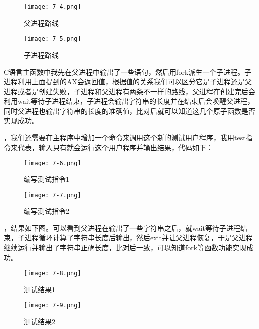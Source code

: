 \documentclass[UTF8]{article}
\begin{document}
\begin{figure}[htbp]
			\begin{minipage}[t]{0.5\linewidth}
			\centering
			\texttt{[image: 7-4.png]}
			\caption{父进程路线}
			\end{minipage}
			\begin{minipage}[t]{0.5\linewidth}
				\centering
			\texttt{[image: 7-5.png]}
			\caption{子进程路线}
			\end{minipage}
		\end{figure}
\par C语言主函数中我先在父进程中输出了一些语句，然后用fork派生一个子进程。子进程利用上面提到的AX会返回值，根据值的关系我们可以区分它是子进程还是父进程或者是创建失败，子进程和父进程有两条不一样的路线，父进程在创建完后会利用wait等待子进程结束，子进程会输出字符串的长度并在结束后会唤醒父进程，同时父进程也输出字符串的长度的准确值，比对后就可以知道这几个原子函数是否实现成功。

，我们还需要在主程序中增加一个命令来调用这个新的测试用户程序，我用test指令来代表，输入只有就会运行这个用户程序并输出结果，代码如下：
\begin{figure}[htbp]
			\begin{minipage}[t]{0.5\linewidth}
			\centering
			\texttt{[image: 7-6.png]}
			\caption{编写测试指令1}
			\end{minipage}
			\begin{minipage}[t]{0.5\linewidth}
				\centering
			\texttt{[image: 7-7.png]}
			\caption{编写测试指令2}
			\end{minipage}
		\end{figure}

，结果如下图。可以看到父进程在输出了一些字符串之后，就wait等待子进程结束，子进程循环计算了字符串长度后输出，然后exit并让父进程恢复，于是父进程继续运行并输出了字符串正确长度，比对后一致，可以知道fork等函数功能实现成功。
\begin{figure}[htbp]
			\begin{minipage}[t]{0.5\linewidth}
			\centering
			\texttt{[image: 7-8.png]}
			\caption{测试结果1}
			\end{minipage}
			\begin{minipage}[t]{0.5\linewidth}
				\centering
			\texttt{[image: 7-9.png]}
			\caption{测试结果2}
			\end{minipage}
		\end{figure}
\end{document}
